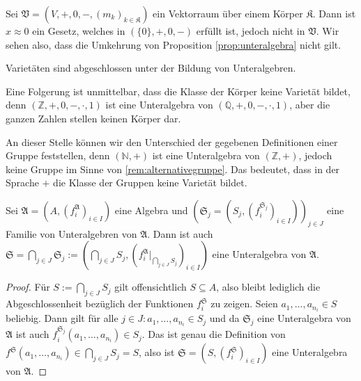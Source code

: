 \begin{remark}
    Sei $\mathfrak{V}=(V,+,0,-,(m_k)_{k\in\mathfrak{K}})$ ein Vektorraum über einem Körper $\mathfrak{K}$.
    Dann ist $x\approx 0$ ein Gesetz, welches in $(\{0\},+,0,-)$ erfüllt ist, jedoch nicht in $\mathfrak{V}$.
    Wir sehen also, dass die Umkehrung von Proposition \ref{prop:unteralgebra} nicht gilt.
\end{remark}

\begin{corollary}\label{corollary:sub-varietaeten}
    Varietäten sind abgeschlossen unter der Bildung von Unteralgebren.
\end{corollary}

\begin{remark}
    Eine Folgerung ist unmittelbar, dass die Klasse der Körper keine Varietät bildet,
    denn $(\mathbb{Z},+,0,-,\cdot,1)$ ist eine Unteralgebra von $(\mathbb{Q},+,0,-,\cdot,1)$, aber die ganzen Zahlen stellen keinen Körper dar.
\end{remark}

\begin{remark}
    An dieser Stelle können wir den Unterschied der gegebenen Definitionen einer Gruppe feststellen,
    denn $(\mathbb{N},+)$ ist eine Unteralgebra von $(\mathbb{Z},+)$, jedoch keine Gruppe im Sinne von 
    \cref{rem:alternativegruppe}. Das bedeutet, dass in der Sprache $+$ die Klasse der Gruppen keine Varietät bildet.
\end{remark}

\vspace*{-\lineskip}

\begin{proposition}
    Sei $\mathfrak{A}=(A,(f^\mathfrak{A}_i)_{i\in I})$ eine Algebra und $(\mathfrak{S}_j = (S_j, (f_i^{\mathfrak{S}_j})_{i \in I}))_{j\in J}$ eine Familie von Unteralgebren
    von $\mathfrak{A}$. Dann ist auch $\mathfrak{S} = \bigcap_{j \in J} \mathfrak{S}_j := (\bigcap_{j\in J}S_j,(f^\mathfrak{A}_i\vert_{\bigcap_{j\in J}S_j})_{i\in I})$ eine Unteralgebra von $\mathfrak{A}$.
\end{proposition}

\begin{proof}
    Für $S:=\bigcap_{j\in J}S_j$ gilt offensichtlich $S\subseteq A$, also bleibt lediglich die Abgeschlossenheit bezüglich
    der Funktionen $f^\mathfrak{S}_i$ zu zeigen. Seien $a_1,\ldots,a_{n_i}\in S$ beliebig. Dann gilt für alle
    $j\in J:a_1,\ldots,a_{n_i}\in S_j$ und da $\mathfrak{S}_j$ eine Unteralgebra von $\mathfrak{A}$ ist auch $f^{\mathfrak{S}_j}_i(a_1,\ldots,a_{n_i})\in S_j$.
    Das ist genau die Definition von $f^\mathfrak{S}(a_1,\ldots,a_{n_i})\in \bigcap_{j\in J}S_j=S$, also ist $\mathfrak{S}=(S,(f^\mathfrak{S}_i)_{i\in I})$ eine Unteralgebra von $\mathfrak{A}$.
\end{proof}

